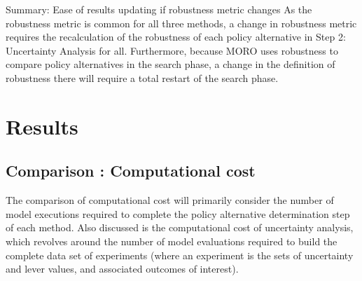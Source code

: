     \begin{comparisonbox}{Summary: Ease of results updating if robustness metric changes}
        As the robustness metric is common for all three methods, a change in robustness metric requires the recalculation of the robustness of each policy alternative in Step 2: Uncertainty Analysis for all. Furthermore, because MORO uses robustness to compare policy alternatives in the search phase, a change in the definition of robustness there will require a total restart of the search phase. 
    \end{comparisonbox}

\section{Results}\label{results-compare-results}
    \subsection{Comparison \thecomparison : Computational cost} 
    The comparison of computational cost will primarily consider the number of model executions required to complete the policy alternative determination step of each method. Also discussed is the computational cost of uncertainty analysis, which revolves around the number of model evaluations required to build the complete data set of experiments (where an experiment is the sets of uncertainty and lever values, and associated outcomes of interest). 
    
